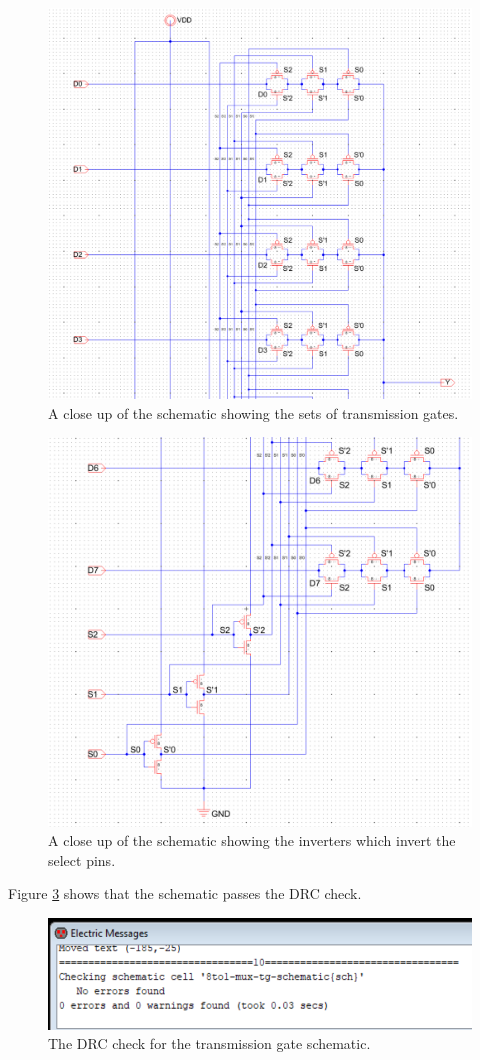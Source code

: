 \documentclass{article}
\begin{document}
    \begin{figure}[H]
      \centering
      \includegraphics[width=0.6\linewidth, frame]{screenshots/tg/schem/schem2.png}
      \caption{A close up of the schematic showing the sets of transmission gates.}
      \label{fig:tgschem2}
    \end{figure}

    \begin{figure}[H]
      \centering
      \includegraphics[width=0.6\linewidth, frame]{screenshots/tg/schem/schem3.png}
      \caption{A close up of the schematic showing the inverters which invert the select pins.}
      \label{fig:tgschem3}
    \end{figure}


    Figure \ref{fig:tgschemdrc} shows that the schematic passes the DRC check.


    \begin{figure}[H]
      \centering
      \includegraphics[width=0.6\linewidth, frame]{screenshots/tg/schem/drc.png}
      \caption{The DRC check for the transmission gate schematic.}
      \label{fig:tgschemdrc}
    \end{figure}
\end{document}
